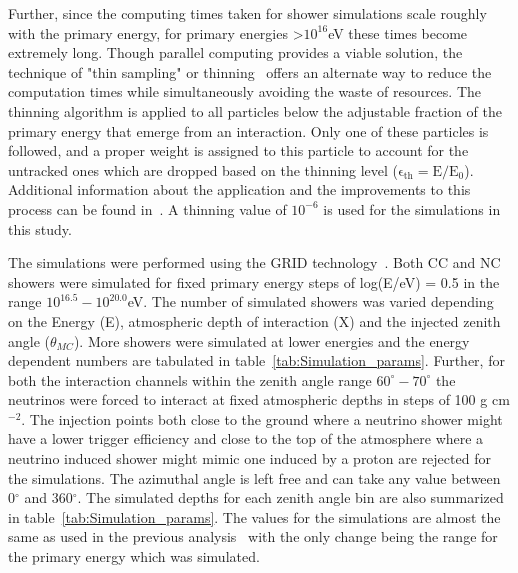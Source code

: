 Further, since the computing times taken for shower simulations scale roughly with the primary energy, for primary energies >$10^{16}$eV these times become extremely long. Though parallel computing provides a viable solution, the technique of "thin sampling" or thinning~\cite{Hillas:1997tf} offers an alternate way to reduce the computation times while simultaneously avoiding the waste of resources. The thinning algorithm is applied to all particles below the adjustable fraction of the primary energy that emerge from an interaction. Only one of these particles is followed, and a proper weight is assigned to this particle to account for the untracked ones which are dropped based on the thinning level ($\mathrm{\epsilon_{th} = E/E_0}$). Additional information about the application and the improvements to this process can be found in~\cite{Heck:1998gr,Kobal:2001jx}. A thinning value of $10^{-6}$ is used for the simulations in this study.


The simulations were performed using the GRID technology~\cite{GRID_tech,LozanoBahilo:2012pe}. Both CC and NC showers were simulated for fixed primary energy steps of log(E/eV) = 0.5 in the range $10^{16.5}-10^{20.0}$eV. The number of simulated showers was varied depending on the Energy (E), atmospheric depth of interaction (X) and the injected zenith angle ($\theta_{MC}$). More showers were simulated at lower energies and the energy dependent numbers are tabulated in table~\ref{tab:Simulation_params}. Further, for both the interaction channels within the zenith angle range $60^{\circ}-70^{\circ}$ the neutrinos were forced to interact at fixed atmospheric depths in steps of 100 g cm$^{-2}$. The injection points both close to the ground where a neutrino shower might have a lower trigger efficiency and close to the top of the atmosphere where a neutrino induced shower might mimic one induced by a proton are rejected for the simulations. The azimuthal angle is left free and can take any value between 0$^{\circ}$ and 360$^{\circ}$. The simulated depths for each zenith angle bin are also summarized in table~\ref{tab:Simulation_params}. The values for the simulations are almost the same as used in the previous analysis~\cite{gap_note_2013} with the only change being the range for the primary energy which was simulated.

